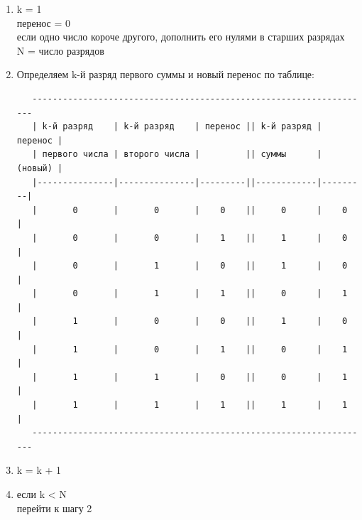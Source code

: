 \documentclass[11pt]{book}
\begin{document}
\begin{enumerate}
\item
   k = 1
\\
   перенос = 0
\\
   если одно число короче другого, дополнить его нулями в старших разрядах
\\
   N = число разрядов
\\
\item Определяем k-й разряд первого суммы и новый перенос по таблице:
\begin{verbatim}
   -------------------------------------------------------------------
   | k-й разряд    | k-й разряд    | перенос || k-й разряд | перенос |
   | первого числа | второго числа |         || суммы      | (новый) |
   |---------------|---------------|---------||------------|---------|
   |       0       |       0       |    0    ||     0      |    0    |
   |       0       |       0       |    1    ||     1      |    0    |
   |       0       |       1       |    0    ||     1      |    0    |
   |       0       |       1       |    1    ||     0      |    1    |
   |       1       |       0       |    0    ||     1      |    0    |
   |       1       |       0       |    1    ||     0      |    1    |
   |       1       |       1       |    0    ||     0      |    1    |
   |       1       |       1       |    1    ||     1      |    1    |
   -------------------------------------------------------------------
\end{verbatim}
\item k = k + 1
\item если k < N
\\
       перейти к шагу 2
\end{enumerate}
\end{document}
